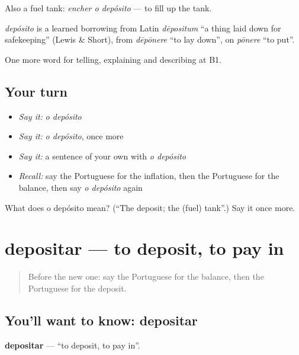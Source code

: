 Also a fuel tank: \emph{encher o depósito} — to fill up the tank.

\begin{cousinweb}
\emph{depósito} is a learned borrowing from Latin \emph{dēpositum} \textquotedblleft{}a thing laid down for safekeeping\textquotedblright{} (Lewis \& Short), from \emph{dēpōnere} \textquotedblleft{}to lay down\textquotedblright{}, on \emph{pōnere} \textquotedblleft{}to put\textquotedblright{}.
\end{cousinweb}

\begin{grammarlens}[title={What you've built}]
One more word for telling, explaining and describing at B1.
\end{grammarlens}

\subsection*{Your turn}
\begin{itemize}
\raggedright
  \item \emph{Say it:} \emph{o depósito}
  \item \emph{Say it:} \emph{o depósito}, once more
  \item \emph{Say it:} a sentence of your own with \emph{o depósito}
  \item \emph{Recall:} say the Portuguese for the inflation, then the Portuguese for the balance, then say \emph{o depósito} again
\end{itemize}

\begin{tcolorbox}[breakable,colback=teal!4,colframe=teal!35!black,title={Before you move on}]
What does o depósito mean? (\textquotedblleft{}The deposit; the (fuel) tank\textquotedblright{}.) Say it once more.
\end{tcolorbox}
\section[depositar]{depositar — to deposit, to pay in}

\label{lesson:PT-C393-depositar}



\begin{quote}
Before the new one: say the Portuguese for the balance, then the Portuguese for the deposit.
\end{quote}

\subsection*{You'll want to know: depositar}
\textbf{depositar} — \textquotedblleft{}to deposit, to pay in\textquotedblright{}.

